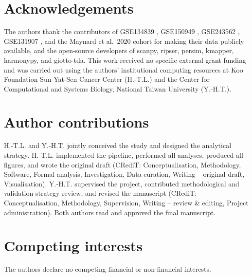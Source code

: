 \documentclass[Numbered, sn-mathphys-num]{sn-jnl}
\begin{document}







\section*{Acknowledgements}
The authors thank the contributors of GSE134839 \citep{aissa2021},
GSE150949 \citep{oren2021}, GSE243562 \citep{wurtz2024}, GSE131907
\citep{kim2020}, and the Maynard et al.~2020 cohort \citep{maynard2020}
for making their data publicly available, and the open-source developers
of scanpy, ripser, persim, kmapper, harmonypy, and giotto-tda. This work
received no specific external grant funding and was carried out using
the authors' institutional computing resources at Koo Foundation Sun
Yat-Sen Cancer Center (H.-T.L.) and the Center for Computational and
Systems Biology, National Taiwan University (Y.-H.T.).

\section*{Author contributions}
H.-T.L. and Y.-H.T. jointly conceived the study and designed the
analytical strategy. H.-T.L. implemented the pipeline, performed all
analyses, produced all figures, and wrote the original draft (CRediT:
Conceptualisation, Methodology, Software, Formal analysis, Investigation,
Data curation, Writing -- original draft, Visualisation). Y.-H.T.
supervised the project, contributed methodological and validation-strategy
review, and revised the manuscript (CRediT: Conceptualisation,
Methodology, Supervision, Writing -- review \& editing, Project
administration). Both authors read and approved the final manuscript.

\section*{Competing interests}
The authors declare no competing financial or non-financial interests.
\end{document}
